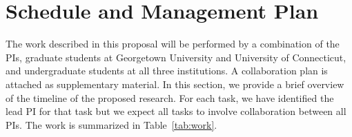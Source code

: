 \documentclass[11pt]{article}
\theoremstyle{remark}
\begin{document}
\section{Schedule and Management Plan}
The work described in this proposal will be performed by a combination of the PIs, graduate students at Georgetown University and University of Connecticut, and undergraduate students at all three institutions.  A collaboration plan is attached as supplementary material.  In this section, we provide a brief overview of the timeline of the proposed research.  For each task, we have identified the lead PI for that task but we expect all tasks to involve collaboration between all PIs.  The work is summarized in Table~\ref{tab:work}.

\clearpage


\end{document}
